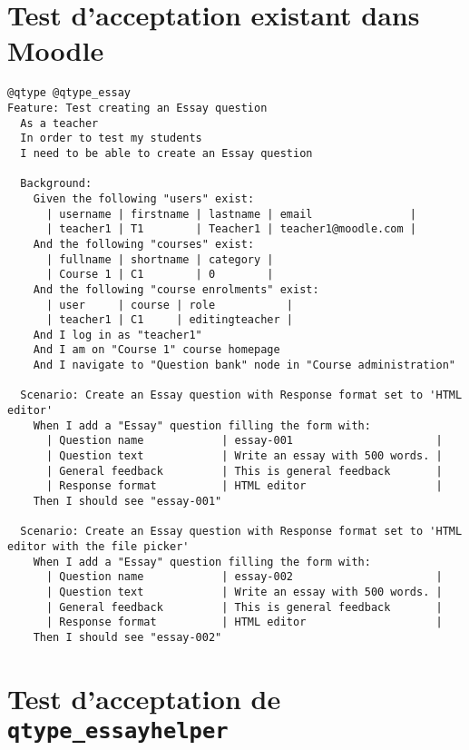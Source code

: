 \appendix
\chapter{Test d'acceptation existant dans Moodle}
\label{annexe_behat_exist}

\begin{lstlisting}[language=behat,frame=l]
@qtype @qtype_essay
Feature: Test creating an Essay question
  As a teacher
  In order to test my students
  I need to be able to create an Essay question

  Background:
    Given the following "users" exist:
      | username | firstname | lastname | email               |
      | teacher1 | T1        | Teacher1 | teacher1@moodle.com |
    And the following "courses" exist:
      | fullname | shortname | category |
      | Course 1 | C1        | 0        |
    And the following "course enrolments" exist:
      | user     | course | role           |
      | teacher1 | C1     | editingteacher |
    And I log in as "teacher1"
    And I am on "Course 1" course homepage
    And I navigate to "Question bank" node in "Course administration"

  Scenario: Create an Essay question with Response format set to 'HTML editor'
    When I add a "Essay" question filling the form with:
      | Question name            | essay-001                      |
      | Question text            | Write an essay with 500 words. |
      | General feedback         | This is general feedback       |
      | Response format          | HTML editor                    |
    Then I should see "essay-001"

  Scenario: Create an Essay question with Response format set to 'HTML editor with the file picker'
    When I add a "Essay" question filling the form with:
      | Question name            | essay-002                      |
      | Question text            | Write an essay with 500 words. |
      | General feedback         | This is general feedback       |
      | Response format          | HTML editor                    |
    Then I should see "essay-002"
\end{lstlisting}

\chapter{Test d'acceptation de \texttt{qtype\_essayhelper}}
\label{annexe_behat_new}

